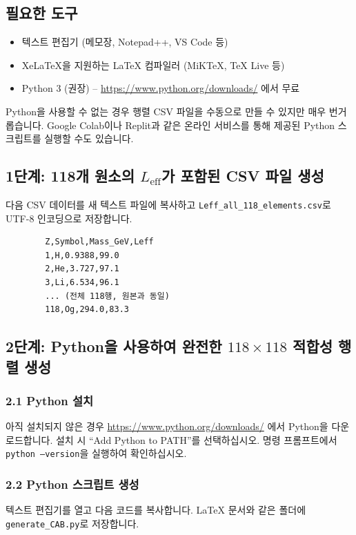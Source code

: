 \documentclass[12pt,a4paper]{article}
\begin{document}
	\subsection*{필요한 도구}
	\begin{itemize}
		\item 텍스트 편집기 (메모장, Notepad++, VS Code 등)
		\item XeLaTeX을 지원하는 LaTeX 컴파일러 (MiKTeX, TeX Live 등)
		\item Python 3 (권장) – \url{https://www.python.org/downloads/} 에서 무료
	\end{itemize}
	Python을 사용할 수 없는 경우 행렬 CSV 파일을 수동으로 만들 수 있지만 매우 번거롭습니다. Google Colab이나 Replit과 같은 온라인 서비스를 통해 제공된 Python 스크립트를 실행할 수도 있습니다.
	
	\subsection*{1단계: 118개 원소의 \(L_{\mathrm{eff}}\)가 포함된 CSV 파일 생성}
	다음 CSV 데이터를 새 텍스트 파일에 복사하고 \texttt{Leff\_all\_118\_elements.csv}로 UTF-8 인코딩으로 저장합니다.
	
	\begin{verbatim}
		Z,Symbol,Mass_GeV,Leff
		1,H,0.9388,99.0
		2,He,3.727,97.1
		3,Li,6.534,96.1
		... (전체 118행, 원본과 동일)
		118,Og,294.0,83.3
	\end{verbatim}
	
	\subsection*{2단계: Python을 사용하여 완전한 \(118\times118\) 적합성 행렬 생성}
	\subsubsection*{2.1 Python 설치}
	아직 설치되지 않은 경우 \url{https://www.python.org/downloads/} 에서 Python을 다운로드합니다. 설치 시 ``Add Python to PATH''를 선택하십시오. 명령 프롬프트에서 \texttt{python --version}을 실행하여 확인하십시오.
	
	\subsubsection*{2.2 Python 스크립트 생성}
	텍스트 편집기를 열고 다음 코드를 복사합니다. LaTeX 문서와 같은 폴더에 \texttt{generate\_CAB.py}로 저장합니다.
	
\end{document}
